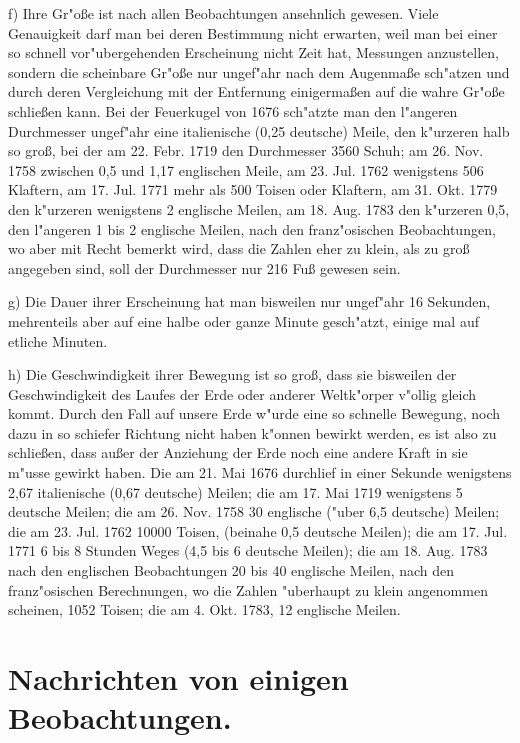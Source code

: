 \documentclass[a4paper, 11pt, oneside, polutonikogreek, german]{article}
\begin{document}
f) Ihre Gr"oße ist nach allen Beobachtungen ansehnlich gewesen. Viele Genauigkeit darf man bei deren Bestimmung nicht erwarten, weil man bei einer so schnell vor"ubergehenden Erscheinung nicht Zeit hat, Messungen anzustellen, sondern die scheinbare Gr"oße nur ungef"ahr nach dem Augenmaße sch"atzen und durch deren Vergleichung mit der Entfernung einigermaßen auf die wahre Gr"oße schließen kann. Bei der Feuerkugel von 1676 sch"atzte man den l"angeren Durchmesser ungef"ahr eine italienische (0,25 deutsche) Meile, den k"urzeren halb so groß, bei der am 22. Febr. 1719 den Durchmesser 3560 Schuh; am 26. Nov. 1758 zwischen 0,5 und 1,17 englischen Meile, am 23. Jul. 1762 wenigstens 506 Klaftern, am 17. Jul. 1771 mehr als 500 Toisen oder Klaftern, am 31. Okt. 1779 den k"urzeren wenigstens 2 englische Meilen, am 18. Aug. 1783 den k"urzeren 0,5, den l"angeren 1 bis 2 englische Meilen, nach den franz"osischen Beobachtungen, wo aber mit Recht bemerkt wird, dass die Zahlen eher zu klein, als zu groß angegeben sind, soll der Durchmesser nur 216 Fuß gewesen sein.

g) Die Dauer ihrer Erscheinung hat man bisweilen nur ungef"ahr 16 Sekunden, mehrenteils aber auf eine halbe oder ganze Minute gesch"atzt, einige mal auf etliche Minuten.

h) Die Geschwindigkeit ihrer Bewegung ist so groß, dass sie bisweilen der Geschwindigkeit des Laufes der Erde oder anderer Weltk"orper v"ollig gleich kommt. Durch den Fall auf unsere Erde w"urde eine so schnelle Bewegung, noch dazu in so schiefer Richtung nicht haben k"onnen bewirkt werden, es ist also zu schließen, dass außer der Anziehung der Erde noch eine andere Kraft in sie m"usse gewirkt haben. Die am 21. Mai 1676 durchlief in einer Sekunde wenigstens 2,67 italienische (0,67 deutsche) Meilen; die am 17. Mai 1719 wenigstens 5 deutsche Meilen; die am 26. Nov. 1758 30 englische ("uber 6,5 deutsche) Meilen; die am 23. Jul. 1762 10000 Toisen, (beinahe 0,5 deutsche Meilen); die am 17. Jul. 1771 6 bis 8 Stunden Weges (4,5 bis 6 deutsche Meilen); die am 18. Aug. 1783 nach den englischen Beobachtungen 20 bis 40 englische Meilen, nach den franz"osischen Berechnungen, wo die Zahlen "uberhaupt zu klein angenommen scheinen, 1052 Toisen; die am 4. Okt. 1783, 12 englische Meilen.
\clearpage
\section{Nachrichten von einigen Beobachtungen.}
\end{document}
